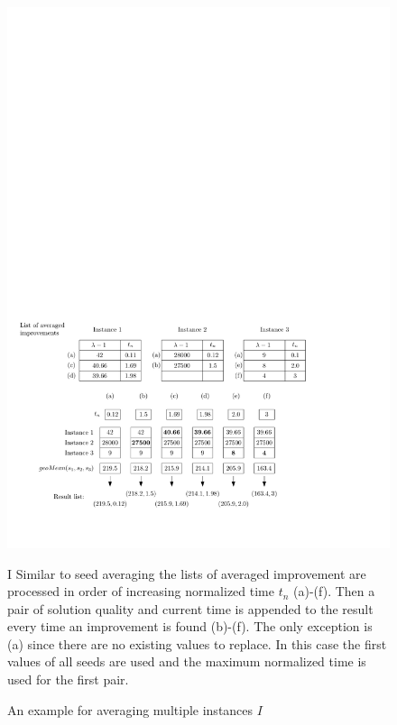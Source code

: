 \documentclass[a4paper,12pt,titlepage, BCOR7mm,headsepline]{scrbook}
\numberwithin{equation}{section}
\begin{document}
\begin{figure}[H] 
    
  \begin{center}
   \includegraphics[width=.9\textwidth]{Ipe/instanceaveragingexample.pdf}
  \caption{An example for averaging multiple instances $I$}\label{fig:averaginginstances} %
  \end{center}I
    Similar to seed averaging the lists of averaged improvement are processed in order of increasing normalized time $t_n$ (a)-(f). Then a pair of solution quality and current time is appended to the result every time an improvement is found (b)-(f). The only exception is (a) since there are no existing values to replace. In this case the first values of all seeds are used and the maximum normalized time is used for the first pair.
\end{figure}

\newpage
\end{document}
